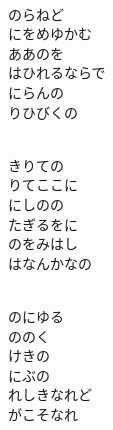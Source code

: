 \documentclass[10pt,b5j]{tarticle} %
\begin{document}
\begin{enumerate}
\begin{minipage}[c]{\blocksize}
    \end{minipage}
    \begin{minipage}[c]{\blocksize}
        
        \vspace{\linespace}
        \item~\\
        のらねど\\
        にをめゆかむ\\
        ああのを\\
        はひれるならで\\
        にらんの\\
        りひびくの
        
    \end{minipage}
    \begin{minipage}[c]{\blocksize}
        
        \vspace{\linespace}
        \item~\\
        きりての\\
        りてここに\\
        にしのの\\
        たぎるをに\\
        のをみはし\\
        はなんかなの
        
    \end{minipage}
    \begin{minipage}[c]{\blocksize}
        
        \vspace{\linespace}
        \item~\\
        のにゆる\\
        ののく\\
        けきの\\
        にぶの\\
        れしきなれど\\
        がこそなれ
    
    \end{minipage}
\end{enumerate} %
\end{document}

